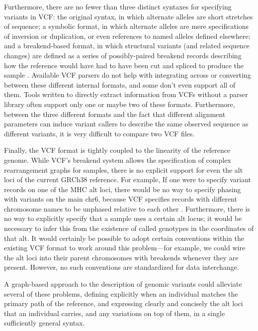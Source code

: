 \documentclass[11pt,proposal]{ucthesis}
\begin{document}
Furthermore, there are no fewer than three distinct syntaxes for specifying variants in VCF: the original syntax, in which alternate alleles are short stretches of sequence; a symbolic format, in which alternate alleles are mere specifications of inversion or duplication, or even references to named alleles defined elsewhere; and a breakend-based format, in which structural variants (and related sequence changes) are defined as a series of possibly-paired breakend records describing how the reference would have had to have been cut and spliced to produce the sample \cite{marshall2013variant}. Available VCF parsers do not help with integrating across or converting between these different internal formats, and some don't even support all of them. Tools written to directly extract information from VCFs without a parser library often support only one or maybe two of these formats. Furthermore, between the three different formats and the fact that different alignment parameters can induce variant callers to describe the same observed sequence as different variants, it is very difficult to compare two VCF files.

Finally, the VCF format is tightly coupled to the linearity of the reference genome. While VCF's breakend system allows the specification of complex rearrangement graphs for samples, there is no explicit support for even the alt loci of the current GRCh38 reference. For example, If one were to specify variant records on one of the MHC alt loci, there would be no way to specify phasing with variants on the main chr6, because VCF specifies records with different chromosome names to be unphased relative to each other \cite{marshall2013variant}. Furthermore, there is no way to explicitly specify that a sample uses a certain alt locus; it would be necessary to infer this from the existence of called genotypes in the coordinates of that alt. It would certainly be possible to adopt certain conventions within the existing VCF format to work around this problem---for example, we could wire the alt loci into their parent chromosomes with breakends whenever they are present. However, no such conventions are standardized for data interchange.

A graph-based approach to the description of genomic variants could alleviate several of these problems, defining explicitly when an individual matches the primary path of the reference, and expressing clearly and concisely the alt loci that an individual carries, and any variations on top of them, in a single sufficiently general syntax.
\end{document}

